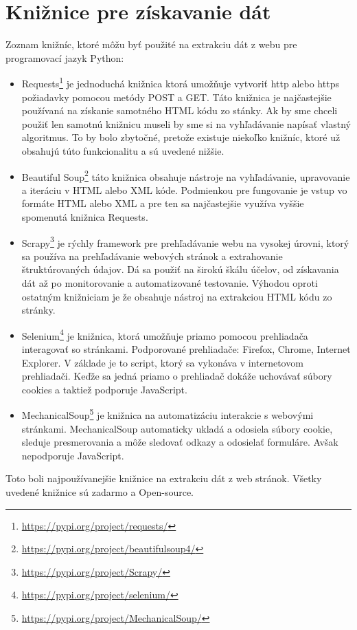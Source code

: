 \documentclass[10pt,twoside,slovak,a4paper]{article}
\begin{document}
\section{Knižnice pre získavanie dát} \label{kniznice}
Zoznam knižníc, ktoré môžu byť použité na extrakciu dát z webu pre programovací jazyk Python:
\begin{itemize}
\item Requests\footnote{\url{https://pypi.org/project/requests/}} je jednoduchá knižnica ktorá umožňuje vytvoriť http alebo https požiadavky pomocou metódy POST a GET. Táto knižnica je najčastejšie používaná na získanie samotného HTML kódu zo stánky. Ak by sme chceli použiť len samotnú knižnicu museli by sme si na vyhľadávanie napísať vlastný algoritmus. To by bolo zbytočné, pretože existuje niekoľko knižníc, ktoré už obsahujú túto funkcionalitu a sú uvedené nižšie.
\item Beautiful Soup\footnote{\url{https://pypi.org/project/beautifulsoup4/}} táto knižnica obsahuje nástroje na vyhľadávanie, upravovanie a iteráciu v HTML alebo XML kóde. Podmienkou pre fungovanie je vstup vo formáte HTML alebo XML a pre ten sa najčastejšie využíva vyššie spomenutá knižnica Requests.
\item Scrapy\footnote{\url{https://pypi.org/project/Scrapy/}} je rýchly framework pre prehľadávanie webu na vysokej úrovni, ktorý sa používa na prehľadávanie webových stránok a extrahovanie štruktúrovaných údajov. Dá sa použiť na širokú škálu účelov, od získavania dát až po monitorovanie a automatizované testovanie. Výhodou oproti ostatným knižniciam je že obsahuje nástroj na extrakciou HTML kódu zo stránky.
\item Selenium\footnote{\url{https://pypi.org/project/selenium/}} je knižnica, ktorá umožňuje priamo pomocou prehliadača interagovať so stránkami. Podporované prehliadače: Firefox, Chrome, Internet Explorer. V základe je to script, ktorý sa vykonáva v internetovom prehliadači. Keďže sa jedná priamo o prehliadač dokáže uchovávať súbory cookies a taktiež podporuje JavaScript. %
\item MechanicalSoup\footnote{\url{https://pypi.org/project/MechanicalSoup/}} je knižnica na automatizáciu interakcie s webovými stránkami. MechanicalSoup automaticky ukladá a odosiela súbory cookie, sleduje presmerovania a môže sledovať odkazy a odosielať formuláre. Avšak nepodporuje JavaScript.
\end{itemize}

Toto boli najpoužívanejšie knižnice na extrakciu dát z web stránok. Všetky uvedené knižnice sú zadarmo a Open-source.
\end{document}
